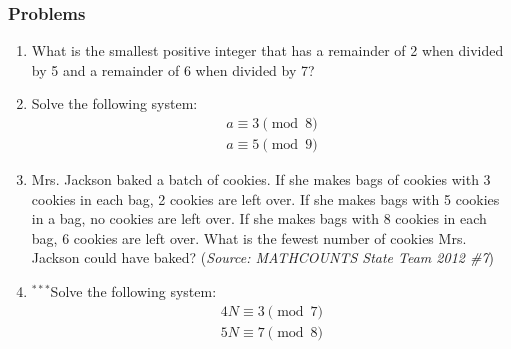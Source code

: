 \subsubsection{Problems}
\begin{enumerate}
    \item What is the smallest positive integer that has a remainder of 2 when divided by 5 and a remainder of 6 when divided by 7?
    \item Solve the following system:
    \begin{align*}
        a \equiv 3 \pmod{8} \\
        a \equiv 5 \pmod{9}
    \end{align*}
    \item Mrs. Jackson baked a batch of cookies. If she makes bags of cookies with 3 cookies in each bag, 2 cookies are left over. If she makes bags with 5 cookies in a bag, no cookies are left over. If she makes bags with 8 cookies in each bag, 6 cookies are left over. What is the fewest number of cookies Mrs. Jackson could have baked? (\textit{Source: MATHCOUNTS State Team 2012 \#7})
    \item $^{\ast\ast\ast}$Solve the following system:
    \begin{align*}
        4N \equiv 3 \pmod{7} \\
        5N \equiv 7 \pmod{8}
    \end{align*}
\end{enumerate}